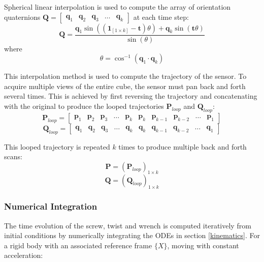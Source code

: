 Spherical linear interpolation is used to compute the array of orientation quaternions
$\mathbf{Q}= \begin{bmatrix}
	\mathbf{q}_1 & \mathbf{q}_2 & \mathbf{q}_3 & \dots & \mathbf{q}_k
\end{bmatrix}$
at each time step:
\begin{equation} \label{slerp}
	\mathbf{Q} = \frac{\mathbf{q}_1\sin((\mathbf{1}_{[1 \times k]}-\mathbf{t})\theta) + \mathbf{q}_k\sin(\mathbf{t}\theta)}{\sin(\theta)}
\end{equation}
where
\begin{equation}
	\theta = \cos^{-1}(\mathbf{q}_1 \cdot \mathbf{q}_k)
\end{equation}

This interpolation method is used to compute the trajectory of the sensor. To acquire multiple views of the  entire cube, the sensor must pan back and forth several times. This is achieved by first reversing the trajectory and concatenating with the original to produce the looped trajectories $\mathbf{P}_{loop}$ and $\mathbf{Q}_{loop}$:
\begin{equation}
	\mathbf{P}_{loop}= 
	\begin{bmatrix}
		\mathbf{p}_1 & \mathbf{p}_2 & \mathbf{p}_3 & \dots & \mathbf{p}_k &
		\mathbf{p}_{k} & \mathbf{p}_{k-1} & \mathbf{p}_{k-2} & \dots & \mathbf{p}_1
	\end{bmatrix}
\end{equation}
\begin{equation}
	\mathbf{Q}_{loop}= 
	\begin{bmatrix}
		\mathbf{q}_1 & \mathbf{q}_2 & \mathbf{q}_3 & \dots & \mathbf{q}_k &
		\mathbf{q}_{k} & \mathbf{q}_{k-1} & \mathbf{q}_{k-2} & \dots & \mathbf{q}_1
	\end{bmatrix}
\end{equation}

This looped trajectory is repeated $k$ times to produce multiple back and forth scans:
\begin{equation}
	\mathbf{P} = ({\mathbf{P}_{loop}})_{1 \times k}
\end{equation}
\begin{equation}
	\mathbf{Q} = ({\mathbf{Q}_{loop}})_{1 \times k}
\end{equation}


\subsubsection{Numerical Integration} \label{integration}
The time evolution of the screw, twist and wrench is computed iteratively from initial conditions by numerically integrating the ODEs in section \ref{kinematics}. For a rigid body with an associated reference frame $\{X\}$, moving with constant acceleration:

